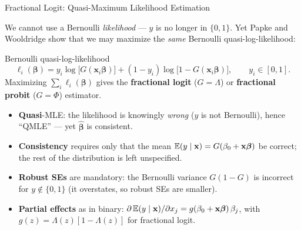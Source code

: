 \documentclass[aspectratio=169, 12pt]{beamer}
\newcommand{\xbeta}{\mathbf{x}\boldsymbol{\beta}}   %
\newcommand{\xib}{\mathbf{x}_i\boldsymbol{\beta}}    %
\begin{document}
\begin{frame}[shrink=10]{Fractional Logit: Quasi-Maximum Likelihood Estimation}

  We cannot use a Bernoulli \emph{likelihood} --- $y$ is no longer in $\{0,1\}$.
  Yet Papke and Wooldridge \citep{PapkeWooldridge1996_fractional} show that we may
  maximize the \emph{same} Bernoulli quasi-log-likelihood:

  \begin{definitionbox}{Bernoulli quasi-log-likelihood}
    \[
      \ell_i(\boldsymbol\beta) = y_i\log\!\big[G(\xib)\big]
        + (1-y_i)\log\!\big[1-G(\xib)\big], \qquad y_i \in [0,1].
    \]
    Maximizing $\sum_i \ell_i(\boldsymbol\beta)$ gives the \textbf{fractional logit}
    ($G=\Lambda$) or \textbf{fractional probit} ($G=\Phi$) estimator.
  \end{definitionbox}

  \smallskip

  \begin{keybox}
    \small
    \begin{itemize}
      \item \textbf{Quasi}-MLE: the likelihood is knowingly \emph{wrong} ($y$ is not
        Bernoulli), hence ``QMLE'' --- yet $\hat{\boldsymbol\beta}$ is consistent.
      \item \textbf{Consistency} requires only that the mean
        $\E(y\mid\mathbf{x})=G(\beta_0+\xbeta)$ be correct; the rest of the
        distribution is left unspecified.
      \item \textbf{Robust SEs} are mandatory: the Bernoulli variance $G(1-G)$ is
        incorrect for $y\notin\{0,1\}$ (it overstates, so robust SEs are smaller).
      \item \textbf{Partial effects} as in binary:
        $\partial\E(y\mid\mathbf{x})/\partial x_j = g(\beta_0+\xbeta)\,\beta_j$, with
        $g(z)=\Lambda(z)[1-\Lambda(z)]$ for fractional logit.
    \end{itemize}
  \end{keybox}

\end{frame}
\end{document}

